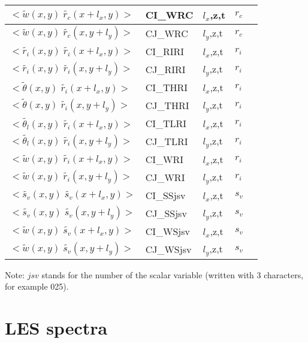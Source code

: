 \begin{longtable}[c]{|p{}|p{}|p{}|p{}|p{}|}
$<\tilde{w}(x,y)\;\tilde{r_c}(x+l_x,y)>$             & CI\_WRC   & $l_x$,z,t & $r_c$       & \\\hline
$<\tilde{w}(x,y)\;\tilde{r_c}(x,y+l_y)>$             & CJ\_WRC   & $l_y$,z,t & $r_c$       & \\\hline
$<\tilde{r_i}(x,y)\;\tilde{r_i}(x+l_x,y)>$           & CI\_RIRI  & $l_x$,z,t & $r_i$       & \\\hline
$<\tilde{r_i}(x,y)\;\tilde{r_i}(x,y+l_y)>$           & CJ\_RIRI  & $l_y$,z,t & $r_i$       & \\\hline
$<\tilde{\theta}(x,y)\;\tilde{r_i}(x+l_x,y)>$        & CI\_THRI  & $l_x$,z,t & $r_i$       & \\\hline
$<\tilde{\theta}(x,y)\;\tilde{r_i}(x,y+l_y)>$        & CJ\_THRI  & $l_y$,z,t & $r_i$       & \\\hline
$<\tilde{\theta_l}(x,y)\;\tilde{r_i}(x+l_x,y)>$      & CI\_TLRI  & $l_x$,z,t & $r_i$       & \\\hline
$<\tilde{\theta_l}(x,y)\;\tilde{r_i}(x,y+l_y)>$      & CJ\_TLRI  & $l_y$,z,t & $r_i$       & \\\hline
$<\tilde{w}(x,y)\;\tilde{r_i}(x+l_x,y)>$             & CI\_WRI   & $l_x$,z,t & $r_i$       & \\\hline
$<\tilde{w}(x,y)\;\tilde{r_i}(x,y+l_y)>$             & CJ\_WRI   & $l_y$,z,t & $r_i$       & \\\hline
$<\tilde{s_v}(x,y)\;\tilde{s_v}(x+l_x,y)>$           & CI\_SSjsv & $l_x$,z,t & $s_v$       & \\\hline
$<\tilde{s_v}(x,y)\;\tilde{s_v}(x,y+l_y)>$           & CJ\_SSjsv & $l_y$,z,t & $s_v$       & \\\hline
$<\tilde{w}(x,y)\;\tilde{s_v}(x+l_x,y)>$             & CI\_WSjsv & $l_x$,z,t & $s_v$       & \\\hline
$<\tilde{w}(x,y)\;\tilde{s_v}(x,y+l_y)>$             & CJ\_WSjsv & $l_y$,z,t & $s_v$       & \\\hline
\end{longtable}

Note: $jsv$ stands for the number of the scalar variable (written with 3 characters, for example 025).


\section{LES spectra}

